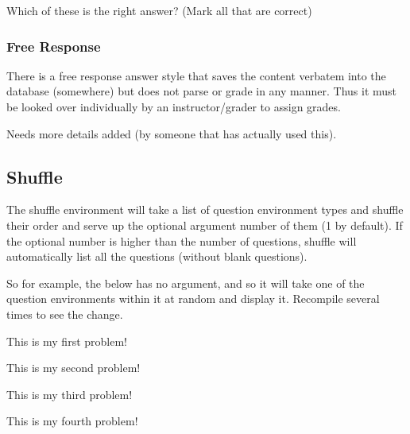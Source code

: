\documentclass{ximera}
\begin{document}
\begin{problem}
Which of these is the right answer? (Mark all that are correct)
\begin{multipleChoice}
\end{multipleChoice}
\end{problem}



\subsubsection{Free Response}
There is a free response answer style that saves the content verbatem into the database (somewhere) but does not parse or grade in any manner. Thus it must be looked over individually by an instructor/grader to assign grades. 

Needs more details added (by someone that has actually used this).

\subsection{Shuffle} 
The shuffle environment will take a list of question environment types and shuffle their order and serve up the optional argument number of them (1 by default). If the optional number is higher than the number of questions, shuffle will automatically list all the questions (without blank questions).

So for example, the below has no argument, and so it will take one of the question environments within it at random and display it. Recompile several times to see the change.

\begin{shuffle}
\begin{problem}
This is my first problem!
\end{problem}

\begin{exercise}
This is my second problem!
\end{exercise}

\begin{exploration}
This is my third problem!
\end{exploration}

\begin{question}
This is my fourth problem!
\end{question}
\end{shuffle}
\end{document}
